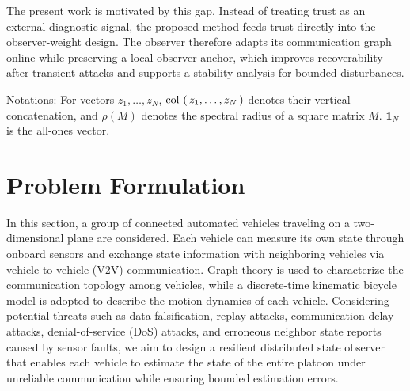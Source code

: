\documentclass[journal,twoside]{IEEEtran}
\def\col#1{\mathop{{\rm col}\,\left(\,#1\,\right)}}
\begin{document}
The present work is motivated by this gap. Instead of treating trust as an external diagnostic signal, the proposed method feeds trust directly into the observer-weight design. The observer therefore adapts its communication graph online while preserving a local-observer anchor, which improves recoverability after transient attacks and supports a stability analysis for bounded disturbances.

Notations: For vectors $z_1,\ldots,z_N$, $\col{z_1,\ldots,z_N}$ denotes their vertical concatenation, and $\rho(M)$ denotes the spectral radius of a square matrix $M$. $\mathbf{1}_N$ is the all-ones vector.

\section{Problem Formulation}\label{sec_vehiclemodel}

In this section, a group of connected automated vehicles traveling on a two-dimensional plane are considered. Each vehicle can measure its own state through onboard sensors and exchange state information with neighboring vehicles via vehicle-to-vehicle (V2V) communication. Graph theory is used to characterize the communication topology among vehicles, while a discrete-time kinematic bicycle model is adopted to describe the motion dynamics of each vehicle. Considering potential threats such as data falsification, replay attacks, communication-delay attacks, denial-of-service (DoS) attacks, and erroneous neighbor state reports caused by sensor faults, we aim to design a resilient distributed state observer that enables each vehicle to estimate the state of the entire platoon under unreliable communication while ensuring bounded estimation errors.
\end{document}
